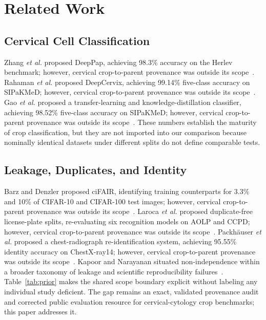 \documentclass[conference]{IEEEtran}
\begin{document}
\section{Related Work}
\subsection{Cervical Cell Classification}
Zhang \emph{et al.} proposed DeepPap, achieving 98.3\% accuracy on the Herlev benchmark; however, cervical crop-to-parent provenance was outside its scope~\cite{zhang2017deeppap}.
Rahaman \emph{et al.} proposed DeepCervix, achieving 99.14\% five-class accuracy on SIPaKMeD; however, cervical crop-to-parent provenance was outside its scope~\cite{rahaman2021deepcervix}.
Gao \emph{et al.} proposed a transfer-learning and knowledge-distillation classifier, achieving 98.52\% five-class accuracy on SIPaKMeD; however, cervical crop-to-parent provenance was outside its scope~\cite{gao2022knowledge}.
These numbers establish the maturity of crop classification, but they are not imported into our comparison because nominally identical datasets under different splits do not define comparable tests.

\subsection{Leakage, Duplicates, and Identity}
Barz and Denzler proposed ciFAIR, identifying training counterparts for 3.3\% and 10\% of CIFAR-10 and CIFAR-100 test images; however, cervical crop-to-parent provenance was outside its scope~\cite{barz2020cifair}.
Laroca \emph{et al.} proposed duplicate-free license-plate splits, re-evaluating six recognition models on AOLP and CCPD; however, cervical crop-to-parent provenance was outside its scope~\cite{laroca2023lpr}.
Packh\"auser \emph{et al.} proposed a chest-radiograph re-identification system, achieving 95.55\% identity accuracy on ChestX-ray14; however, cervical crop-to-parent provenance was outside its scope~\cite{packhauser2022reidentification}.
Kapoor and Narayanan situated non-independence within a broader taxonomy of leakage and scientific reproducibility failures~\cite{kapoor2023leakage}.
Table~\ref{tab:prior} makes the shared scope boundary explicit without labeling any individual study deficient.
The gap remains an exact, validated provenance audit and corrected public evaluation resource for cervical-cytology crop benchmarks; this paper addresses it.
\end{document}
